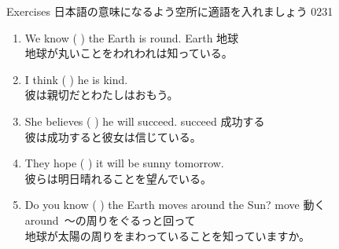 \documentclass[aspectratio=169,xcolor={dvipsnames,table}]{beamer}
\begin{document}
\begin{frame}[plain]{Exercises}\small
日本語の意味になるよう空所に適語を入れましょう%
\hfill{\tiny 0231}\,{\scriptsize {}}

 \begin{enumerate}
  \item We know  (  ) the Earth is round.%
	\hfill{\scriptsize Earth  地球}\\
	地球が丸いことをわれわれは知っている。
  \item I think (  ) he is kind.\\
	彼は親切だとわたしはおもう。
  \item She believes (  ) he will succeed.%
	\hfill{\scriptsize succeed  成功する}\\
	彼は成功すると彼女は信じている。
 \item They hope (  ) it will be sunny tomorrow.\\
       彼らは明日晴れることを望んでいる。
 \item Do you know (  ) the Earth moves around the Sun?%
       \hfill{\scriptsize move  動く}\\
       \hfill{\scriptsize around  \,～の周りをぐるっと回って}\\
       地球が太陽の周りをまわっていることを知っていますか。
 \end{enumerate}
\end{frame}
\end{document}
